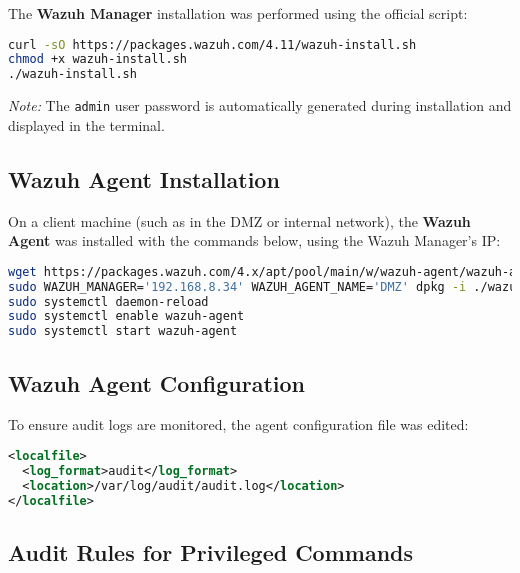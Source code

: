 \documentclass[12pt]{report}
\begin{document}
The \textbf{Wazuh Manager} installation was performed using the official script:

\begin{lstlisting}[language=bash, caption={Wazuh Manager Installation}]
curl -sO https://packages.wazuh.com/4.11/wazuh-install.sh
chmod +x wazuh-install.sh
./wazuh-install.sh
\end{lstlisting}

\textit{Note:} The \texttt{admin} user password is automatically generated during installation and displayed in the terminal.

\subsection*{Wazuh Agent Installation}

On a client machine (such as in the DMZ or internal network), the \textbf{Wazuh Agent} was installed with the commands below, using the Wazuh Manager's IP:

\begin{lstlisting}[language=bash, caption={Wazuh Agent Installation}]
wget https://packages.wazuh.com/4.x/apt/pool/main/w/wazuh-agent/wazuh-agent_4.11.2-1_amd64.deb
sudo WAZUH_MANAGER='192.168.8.34' WAZUH_AGENT_NAME='DMZ' dpkg -i ./wazuh-agent_4.11.2-1_amd64.deb
sudo systemctl daemon-reload
sudo systemctl enable wazuh-agent
sudo systemctl start wazuh-agent
\end{lstlisting}

\subsection*{Wazuh Agent Configuration}

To ensure audit logs are monitored, the agent configuration file was edited:

\begin{lstlisting}[language=xml, caption={Audit Log Monitoring Addition}]
<localfile>
  <log_format>audit</log_format>
  <location>/var/log/audit/audit.log</location>
</localfile>
\end{lstlisting}

\subsection*{Audit Rules for Privileged Commands}
\end{document}
